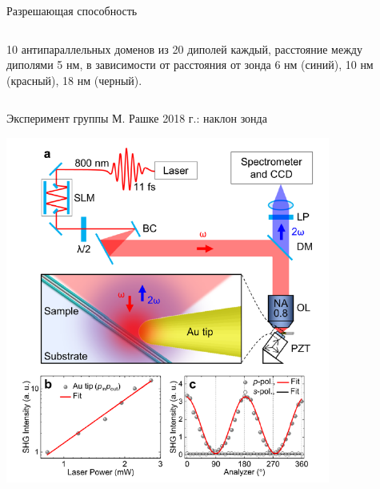 \documentclass[9pt, compress, xcolor=table]{beamer}
\begin{document}
\begin{frame}{Разрешающая способность}
\begin{columns}
{\scriptsize 10 антипараллельных доменов из 20 диполей каждый, расстояние между диполями 5 нм, в зависимости от расстояния от зонда 6 нм (синий), 10 нм (красный), 18 нм (черный).}

\end{columns}
\end{frame}

\begin{frame}{Эксперимент группы М. Рашке 2018 г.: наклон зонда}

\begin{center}
\includegraphics[width=0.8\textwidth]{shg31}

\end{center}




\end{frame}
\end{document}
